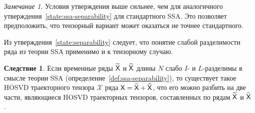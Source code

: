 \documentclass[specialist,
    substylefile=spbu.rtx,
    subf,href,colorlinks=true, 12pt]{disser}
\theoremstyle{plain}
\theoremstyle{definition}
\newtheorem*{corollary}{Следствие}
\theoremstyle{remark}
\newtheorem*{remark}{Замечание}
\begin{document}
    \begin{remark}
        Условия утверждения выше сильнее, чем для аналогичного утверждения~\ref{state:ssa-separability}
        для стандартного SSA.
        Это позволяет предположить, что тензорный вариант может оказаться не точнее стандартного.
    \end{remark}

    Из утверждения~\ref{state:separability} следует, что понятие слабой разделимости ряда из теории SSA
    применимо и к тензорному случаю.
    \begin{corollary}
        Если временные ряды $\widetilde{\mathsf{X}}$ и $\widehat{\mathsf{X}}$ длины $N$ слабо $I$- и $L$-разделимы
        в смысле теории SSA (определение~\ref{def:ssa-separability}),
        то существует такое HOSVD траекторного тензора $\mathcal{X}$ ряда
        $\mathsf{X}=\widetilde{\mathsf{X}} + \widehat{\mathsf{X}}$, что его можно разбить
        на две части, являющиеся HOSVD траекторных тензоров, составленных по рядам
        $\widetilde{\mathsf{X}}$ и $\widehat{\mathsf{X}}$.
    \end{corollary}
\end{document}
